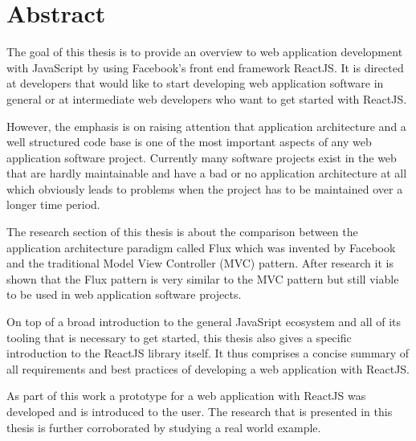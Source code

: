 \chapter*{Abstract}

The goal of this thesis is to provide an overview to web application development with JavaScript by using Facebook's front end framework ReactJS. It is directed at developers that would like to start developing web application software in general or at intermediate web developers who want to get started with ReactJS. 


However, the emphasis is on raising attention that application architecture and a well structured code base is one of the most important aspects of any web application software project. Currently many software projects exist in the web that are hardly maintainable and have a bad or no application architecture at all which obviously leads to problems when the project has to be maintained over a longer time period.

The research section of this thesis is about the comparison between the application architecture paradigm called Flux which was invented by Facebook and the traditional Model View Controller (MVC) pattern. After research it is shown that the Flux pattern is very similar to the MVC pattern but still viable to be used in web application software projects.

On top of a broad introduction to the general JavaSript ecosystem and all of its tooling that is necessary to get started, this thesis also gives a specific introduction to the ReactJS library itself. It thus comprises a concise summary of all requirements and best practices of developing a web application with ReactJS.

As part of this work a prototype for a web application with ReactJS was developed and is introduced to the user. The research that is presented in this thesis is further corroborated by studying a real world example.






